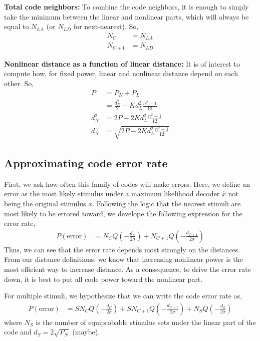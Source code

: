 \documentclass[letter,12pt]{article}
\begin{document}
\textbf{Total code neighbors:}
To combine the code neighbors, it is enough to simply take the minimum between
the linear and nonlinear parts, which will always be equal to $N_{LA}$ (or $N_{LD}$
for next-nearest). So,
\begin{align}
  N_{C} &= N_{LA} \\ 
  N_{C + 1} &= N_{LD}
\end{align}

\textbf{Nonlinear distance as a function of linear distance:}
It is of interest to compute how, for fixed power, linear and nonlinear
distance depend on each other. So,
\begin{align}
  P &= P_{N} + P_{L} \\
  &= \frac{d_{N}^{2}}{2} + K d_{L}^{2} \frac{n^{2} - 1}{12} \\
  d_{N}^{2} &= 2 P - 2 K d_{L}^{2} \frac{n^{2} - 1}{12}\\
  d_{N} &= \sqrt{2P - 2 K d_{L}^{2} \frac{n^{2} - 1}{12}}
\end{align}

\subsection{Approximating code error rate}
First, we ask how often this family of codes will make errors. Here, we
define an error as the most likely stimulus under a maximum likelihood decoder
$\hat{x}$ not being the original stimulus $x$. Following the logic that the
nearest stimuli are most likely to be errored toward, we develope the following
expression for the error rate,
\begin{align}
  P(\textrm{error}) &= N_{C} Q\left(-\frac{d_{C}}{2\sigma}\right)
  + N_{C + 1} Q\left(-\frac{d_{C + 1}}{2\sigma}\right)
\end{align}
Thus, we can see that the error rate depends most strongly on the distances.
From our distance definitions, we know that increasing nonlinear power is the
most efficient way to increase distance. As a consequence, to drive the error
rate down, it is best to put all code power toward the nonlinear part. 

For multiple stimuli, we hypothesize that we can write the code error rate as,
\begin{align}
  P(\textrm{error}) &= S N_{C} Q\left(-\frac{d_{C}}{2\sigma}\right)
  + S N_{C + 1} Q\left(-\frac{d_{C + 1}}{2\sigma}\right)
  + N_{S} Q\left(-\frac{d_{S}}{2\sigma}\right)
\end{align}
where $N_{S}$ is the number of equiprobable stimulus sets under the linear part
of the code and $d_{S} = 2\sqrt{P_{N}}$ (maybe).
\end{document}
